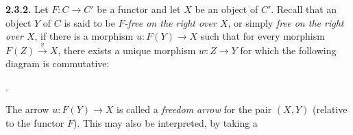 \medskip
\noindent\textbf{2.3.2.}\quad
{}
Let $F\colon C\longrightarrow C'$ be a functor and let $X$ be an object of
$C'$. Recall that an object $Y$ of $C$ is said to be \emph{$F$-free on the
right over $X$}, or simply \emph{free on the right over $X$}, if there is
a morphism $u\colon F(Y)\longrightarrow X$ such that for every morphism
$F(Z)\xrightarrow{v}X$, there exists a unique morphism
$w\colon Z\longrightarrow Y$ for which the following diagram is
commutative:

\begin{center}
  \quad .
\end{center}

The arrow $u\colon F(Y)\longrightarrow X$ is called a \emph{freedom arrow}
for the pair $(X,Y)$ (relative to the functor $F$). This may also be
interpreted, by taking a
\endgroup
